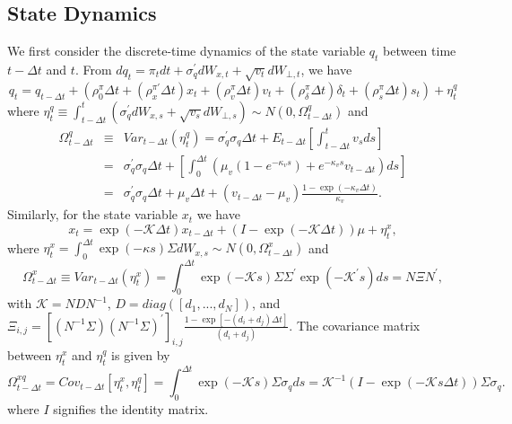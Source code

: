 \documentclass{article}
\begin{document}
\subsection{State Dynamics}

We first consider the discrete-time dynamics of the state variable $q_{t}$
between time $t-\Delta t$ and $t$. From $dq_{t}=\pi _{t}dt+\sigma
_{q}^{\prime }dW_{x,t}+\sqrt{v_{t}}dW_{\bot ,t}$, we have%
\begin{equation*}
q_{t}=q_{t-\Delta t}+\left( \rho _{0}^{\pi }\Delta t+\left( \rho _{x}^{\pi
\prime }\Delta t\right) x_{t}+\left( \rho _{v}^{\pi }\Delta t\right)
v_{t}+\left( \rho _{\delta }^{\pi }\Delta t\right) \delta _{t}+\left( \rho
_{s}^{\pi }\Delta t\right) s_{t}\right) +\eta _{t}^{q}
\end{equation*}%
where $\eta _{t}^{q}\equiv \int_{t-\Delta t}^{t}\left( \sigma _{q}^{\prime
}dW_{x,s}+\sqrt{v_{s}}dW_{\bot ,s}\right) \sim N\left( 0,\Omega _{t-\Delta
t}^{q}\right) $ and%
\begin{eqnarray*}
\Omega _{t-\Delta t}^{q} &\equiv &Var_{t-\Delta t}\left( \eta
_{t}^{q}\right) =\sigma _{q}^{\prime }\sigma _{q}\Delta t+E_{t-\Delta t} 
\left[ \int_{t-\Delta t}^{t}v_{s}ds\right] \\
&=&\sigma _{q}^{\prime }\sigma _{q}\Delta t+\left[ \int_{0}^{\Delta t}\left(
\mu _{v}\left( 1-e^{-\kappa _{v}s}\right) +e^{-\kappa _{v}s}v_{t-\Delta
t}\right) ds\right] \\
&=&\sigma _{q}^{\prime }\sigma _{q}\Delta t+\mu _{v}\Delta t+\left(
v_{t-\Delta t}-\mu _{v}\right) \frac{1-\exp \left( -\kappa _{v}\Delta
t\right) }{\kappa _{v}}.
\end{eqnarray*}%
Similarly, for the state variable $x_{t}$ we have%
\begin{equation*}
x_{t}=\exp \left( -\mathcal{K}\Delta t\right) x_{t-\Delta t}+\left( I-\exp
\left( -\mathcal{K}\Delta t\right) \right) \mu +\eta _{t}^{x},
\end{equation*}%
where $\eta _{t}^{x}=\int_{0}^{\Delta t}\exp \left( -\kappa s\right) \Sigma
dW_{x,s}\sim N\left( 0,\Omega _{t-\Delta t}^{x}\right) $ and%
\begin{equation*}
\Omega _{t-\Delta t}^{x}\equiv Var_{t-\Delta t}\left( \eta _{t}^{x}\right)
=\int_{0}^{\Delta t}\exp \left( -\mathcal{K}s\right) \Sigma \Sigma ^{\prime
}\exp \left( -\mathcal{K}^{\prime }s\right) ds=N\Xi N^{\prime },
\end{equation*}%
with $\mathcal{K=}NDN^{-1}$, $D=diag\left( \left[ d_{1},...,d_{N}\right]
\right) $, and $\Xi _{i,j}=\left[ (N^{-1}\Sigma )(N^{-1}\Sigma )^{\prime }%
\right] _{i,j}\frac{1-\exp \left[ -\left( d_{i}+d_{j}\right) \mathcal{\Delta 
}t\right] }{\left( d_{i}+d_{j}\right) }$. The covariance matrix between $%
\eta _{t}^{x}$ and $\eta _{t}^{q}$ is given by%
\begin{equation*}
\Omega _{t-\Delta t}^{xq}=Cov_{t-\Delta t}\left[ \eta _{t}^{x},\eta _{t}^{q}%
\right] =\int_{0}^{\Delta t}\exp \left( -\mathcal{K}s\right) \Sigma \sigma
_{q}ds=\mathcal{K}^{-1}\left( I-\exp \left( -\mathcal{K}s\Delta t\right)
\right) \Sigma \sigma _{q}.
\end{equation*}%
where $I$ signifies the identity matrix.
\end{document}
